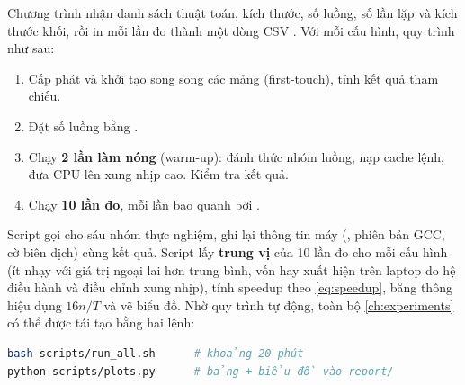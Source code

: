 Chương trình  nhận danh sách thuật toán, kích thước, số luồng, số lần lặp và kích
thước khối, rồi in mỗi lần đo thành một dòng CSV . Với mỗi
cấu hình, quy trình như sau:
\begin{enumerate}
  \item Cấp phát và khởi tạo song song các mảng (first-touch), tính kết quả tham chiếu.
  \item Đặt số luồng bằng .
  \item Chạy \textbf{2 lần làm nóng} (warm-up): đánh thức nhóm luồng, nạp cache lệnh, đưa CPU lên
        xung nhịp cao. Kiểm tra kết quả.
  \item Chạy \textbf{10 lần đo}, mỗi lần bao quanh bởi .
\end{enumerate}
Script  gọi  cho sáu nhóm thực nghiệm, ghi lại thông tin máy
(, phiên bản GCC, cờ biên dịch) cùng kết quả. Script  lấy
\textbf{trung vị} của 10 lần đo cho mỗi cấu hình (ít nhạy với giá trị ngoại lai hơn trung bình,
vốn hay xuất hiện trên laptop do hệ điều hành và điều chỉnh xung nhịp), tính speedup theo
\eqref{eq:speedup}, băng thông hiệu dụng \(16n/T\) và vẽ biểu đồ. Nhờ quy trình tự động, toàn bộ
\cref{ch:experiments} có thể được tái tạo bằng hai lệnh:
\begin{lstlisting}[language=bash,numbers=none]
bash scripts/run_all.sh      # khoảng 20 phút
python scripts/plots.py      # bảng + biểu đồ vào report/
\end{lstlisting}
